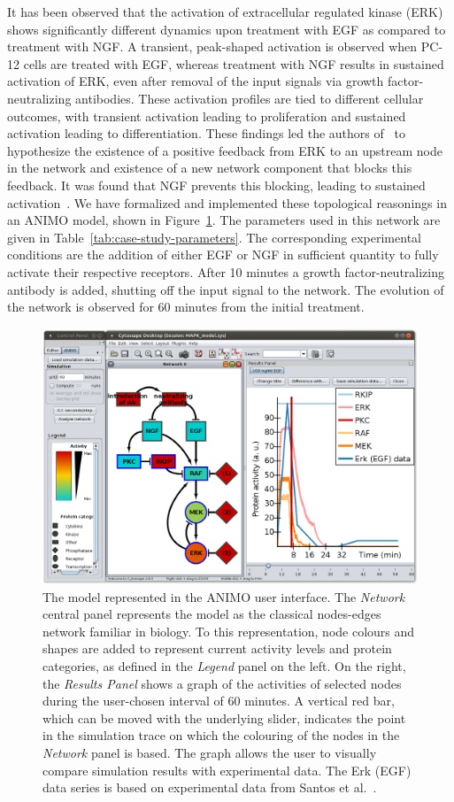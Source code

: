 \documentclass[journal, 10pt]{IEEEtran}
\begin{document}
It has been observed that the activation of extracellular regulated kinase (ERK) shows significantly different 
dynamics upon treatment with EGF as compared to treatment with NGF. A transient, peak-shaped 
activation is observed when PC-12 cells are treated with EGF, whereas treatment with NGF results in sustained activation of ERK,
even after removal of the input signals via growth factor-neutralizing antibodies. These activation profiles are tied to different cellular 
outcomes, with transient activation leading to proliferation and sustained activation leading to differentiation. 
These findings led the authors of~\cite{egf-ngf} to hypothesize the existence of a positive feedback from ERK to an upstream node in the network and 
existence of a new network component that blocks this feedback. It was found that NGF prevents this blocking, leading to sustained activation~\cite{egf-ngf}.
We have formalized and implemented these topological reasonings in an ANIMO model, shown in Figure~\ref{fig:case-study-model}. 
The parameters used in this network are given in Table~\ref{tab:case-study-parameters}.
The corresponding experimental conditions are the addition of either EGF or NGF
in sufficient quantity to fully activate their respective receptors. After 10 minutes a growth factor-neutralizing 
antibody is added, shutting off the input signal to the network. The evolution of the network is
observed for 60 minutes from the initial treatment.

\begin{figure}[htb]
\centering
  \includegraphics[width=.48\textwidth]{mapk_model_egf}
\caption{The model represented in the ANIMO user interface.
The \emph{Network} central panel represents the model as the classical nodes-edges network
familiar in biology. To this representation, node colours and shapes are added %
to represent current activity levels and protein categories, as defined in the \emph{Legend}
panel on the left. On the right, the \emph{Results Panel} shows a graph of the activities
of selected nodes during the user-chosen interval of 60 minutes.
A vertical red bar, which can be moved with the underlying slider, indicates the point in
the simulation trace on which the colouring of the nodes in the \emph{Network} panel is based.
The graph allows the user to visually compare simulation results with experimental data.
The {\sf Erk (EGF) data} series is based on experimental data from Santos et al.~\cite{egf-ngf}.
}\label{fig:case-study-model}
\end{figure}
\end{document}
